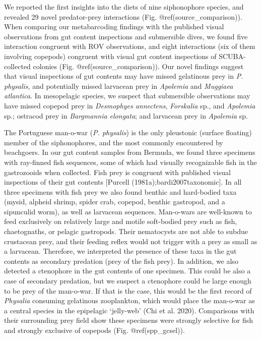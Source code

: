 \documentclass[12pt,]{article}
\begin{document}
We reported the first insights into the diets of nine siphonophore species, and revealed 29 novel predator-prey interactions (Fig. @ref(source\_comparison)). When comparing our metabarcoding findings with the published visual observations from gut content inspections and submersible dives, we found five interaction congruent with ROV observations, and eight interactions (six of them involving copepods) congruent with visual gut content inspections of SCUBA-collected colonies (Fig. @ref(source\_comparison)). Our novel findings suggest that visual inspections of gut contents may have missed gelatinous prey in \emph{P. physalis}, and potentially missed larvacean prey in \emph{Apolemia} and \emph{Muggiaea atlantica}. In mesopelagic species, we suspect that submersible observations may have missed copepod prey in \emph{Desmophyes annectens}, \emph{Forskalia} sp., and \emph{Apolemia} sp.; ostracod prey in \emph{Bargmannia elongata}; and larvacean prey in \emph{Apolemia} sp.

The Portuguese man-o-war (\emph{P. physalis}) is the only pleustonic (surface floating) member of the siphonophores, and the most commonly encountered by beachgoers. In our gut content samples from Bermuda, we found three specimens with ray-finned fish sequences, some of which had visually recognizable fish in the gastrozooids when collected. Fish prey is congruent with published visual inspections of their gut contents {[}Purcell (1981a);bardi2007taxonomic{]}. In all three specimens with fish prey we also found benthic and hard-bodied taxa (mysid, alpheid shrimp, spider crab, copepod, benthic gastropod, and a sipunculid worm), as well as larvacean sequences. Man-o-wars are well-known to feed exclusively on relatively large and motile soft-bodied prey such as fish, chaetognaths, or pelagic gastropods. Their nematocysts are not able to subdue crustacean prey, and their feeding reflex would not trigger with a prey as small as a larvacean. Therefore, we interpreted the presence of these taxa in the gut contents as secondary predation (prey of the fish prey). In addition, we also detected a ctenophore in the gut contents of one specimen. This could be also a case of secondary predation, but we suspect a ctenophore could be large enough to be prey of the man-o-war. If that is the case, this would be the first record of \emph{Physalia} consuming gelatinous zooplankton, which would place the man-o-war as a central species in the epipelagic `jelly-web' (Chi et al. 2020). Comparisons with their surrounding prey field show these specimens were strongly selective for fish and strongly exclusive of copepods (Fig. @ref(spp\_gcsel)).
\end{document}
